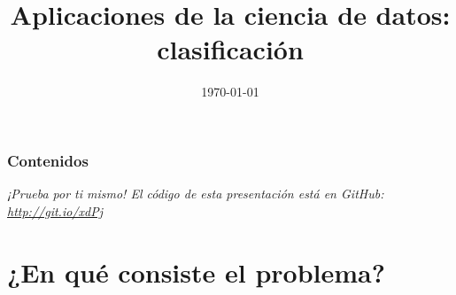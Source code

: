 \documentclass[8pt]{beamer}
\title[Ciencia de datos]{Aplicaciones de la ciencia de datos: clasificación} %
\author[@ncordon \and @fdavidcl \and @M42] %
{\texorpdfstring{
    \begin{columns}
      \column{.25\linewidth}
      \centering
      Ignacio Cordón\\
      \href{http://www.github.com/ncordon}{@ncordon}
      \column{.25\linewidth}
      \centering
      David Charte\\
      \href{http://www.github.com/fdavidcl}{@fdavidcl}
      \column{.25\linewidth}
      \centering
      Mario Román\\
      \href{http://www.github.com/M42}{@M42}
    \end{columns}
}{Ignacio Cordón \and David Charte \and Mario Román}}
\institute[UGR] %
{
  Universidad de Granada \\ %
  \medskip
}
\date{\today} %
\begin{document}
\begin{frame}
\titlepage %
\end{frame}

\begin{frame}
  \frametitle{Contenidos} %
  \tableofcontents
  \textit{¡Prueba por ti mismo! El código de esta presentación está en GitHub: \url{http://git.io/xdPj}}
\end{frame}





\section{¿En qué consiste el problema?}
\end{document}
